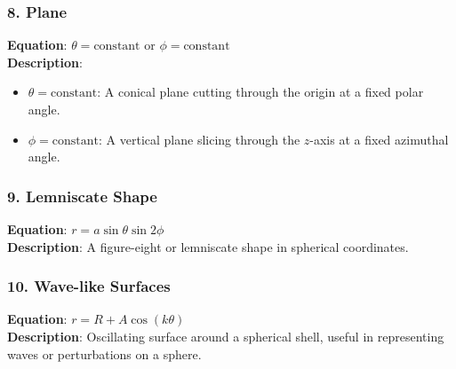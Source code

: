 \documentclass{report}
\begin{document}
\begin{multicols}{2}
\subsubsection{8. Plane}
\textbf{Equation}: \(\theta = \text{constant}\) or \(\phi = \text{constant}\) \\
\textbf{Description}:
\begin{itemize}
    \item \(\theta = \text{constant}\): A conical plane cutting through the origin at a fixed polar angle.
    \item \(\phi = \text{constant}\): A vertical plane slicing through the \(z\)-axis at a fixed azimuthal angle.
\end{itemize}

\begin{center}
	\end{center}


\subsubsection{9. Lemniscate Shape}
\textbf{Equation}: \(r = a \sin\theta \sin2\phi\) \\
\textbf{Description}: A figure-eight or lemniscate shape in spherical coordinates.

\begin{center}
	\end{center}


\subsubsection{10. Wave-like Surfaces}
\textbf{Equation}: \(r = R + A \cos(k\theta)\) \\
\textbf{Description}: Oscillating surface around a spherical shell, useful in representing waves or perturbations on a sphere.


\end{multicols}
\end{document}
